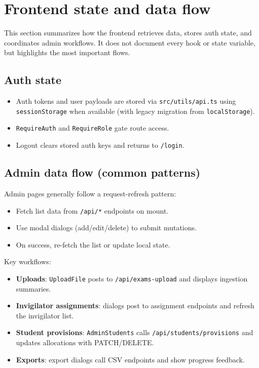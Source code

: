 \section{Frontend state and data flow}
\label{sec:frontend:state}

This section summarizes how the frontend retrieves data, stores auth state, and coordinates admin workflows. It does not document every hook or state variable, but highlights the most important flows.

\subsection{Auth state}
\label{subsec:frontend:state:auth}

\begin{itemize}
  \item Auth tokens and user payloads are stored via \texttt{src/utils/api.ts} using \texttt{sessionStorage} when available (with legacy migration from \texttt{localStorage}).
  \item \texttt{RequireAuth} and \texttt{RequireRole} gate route access.
  \item Logout clears stored auth keys and returns to \texttt{/login}.
\end{itemize}

\subsection{Admin data flow (common patterns)}
\label{subsec:frontend:state:admin}

Admin pages generally follow a request-refresh pattern:

\begin{itemize}
  \item Fetch list data from \texttt{/api/*} endpoints on mount.
  \item Use modal dialogs (add/edit/delete) to submit mutations.
  \item On success, re-fetch the list or update local state.
\end{itemize}

Key workflows:

\begin{itemize}
  \item \textbf{Uploads}: \texttt{UploadFile} posts to \texttt{/api/exams-upload} and displays ingestion summaries.
  \item \textbf{Invigilator assignments}: dialogs post to assignment endpoints and refresh the invigilator list.
  \item \textbf{Student provisions}: \texttt{AdminStudents} calls \texttt{/api/students/provisions} and updates allocations with PATCH/DELETE.
  \item \textbf{Exports}: export dialogs call CSV endpoints and show progress feedback.
\end{itemize}

